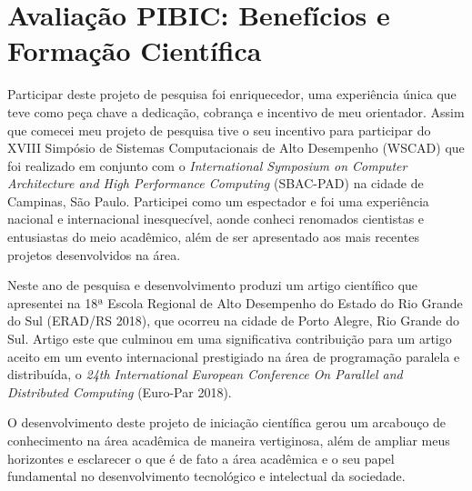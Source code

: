 \documentclass[a4paper,11pt]{article}
\begin{document}
\section{Avaliação PIBIC: Benefícios e Formação Científica}

Participar deste projeto de pesquisa foi enriquecedor, uma experiência única que teve como peça chave a dedicação, cobrança e incentivo de meu orientador. Assim que comecei meu projeto de pesquisa tive o seu incentivo para participar do XVIII Simpósio de Sistemas Computacionais de Alto Desempenho (WSCAD) que foi realizado em conjunto com o \emph{International Symposium on Computer Architecture and High Performance Computing} (SBAC-PAD) na cidade de Campinas, São Paulo. Participei como um espectador e foi uma experiência nacional e internacional inesquecível, aonde conheci renomados cientistas e entusiastas do meio acadêmico, além de ser apresentado aos mais recentes projetos desenvolvidos na área. 

Neste ano de pesquisa e desenvolvimento produzi um artigo científico que apresentei na 18ª Escola Regional de Alto Desempenho do Estado do Rio Grande do Sul (ERAD/RS 2018), que ocorreu na cidade de Porto Alegre, Rio Grande do Sul. Artigo este que culminou em uma significativa contribuição para um artigo aceito em um evento internacional prestigiado na área de programação paralela e distribuída, o \emph{24th International European Conference On Parallel and Distributed Computing} (Euro-Par 2018).

O desenvolvimento deste projeto de iniciação científica gerou um arcabouço de conhecimento na área acadêmica de maneira vertiginosa, além de ampliar meus horizontes e esclarecer o que é de fato a área acadêmica e o seu papel fundamental no desenvolvimento tecnológico e intelectual da sociedade.
 
 

\end{document}
